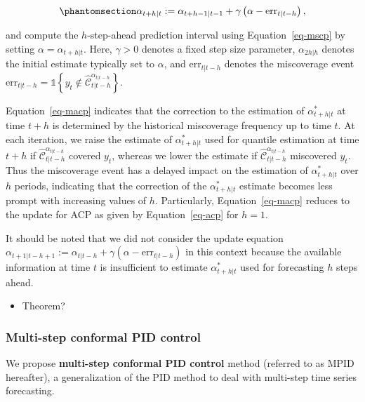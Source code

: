\documentclass[
  11pt,
  a4paper,
]{article}
\providecommand{\tightlist}{%
  \setlength{\itemsep}{0pt}\setlength{\parskip}{0pt}}\usepackage{longtable,booktabs,array}
\theoremstyle{plain}
\theoremstyle{plain}
\theoremstyle{remark}
\begin{document}
\begin{equation}\phantomsection\label{eq-macp}{
\alpha_{t+h|t} := \alpha_{t+h-1|t-1} + \gamma\left(\alpha - \mathrm{err}_{t|t-h}\right),
}\end{equation}

and compute the \(h\)-step-ahead prediction interval using
Equation~\ref{eq-mscp} by setting \(\alpha = \alpha_{t+h|t}\). Here,
\(\gamma > 0\) denotes a fixed step size parameter, \(\alpha_{2h|h}\)
denotes the initial estimate typically set to \(\alpha\), and
\(\mathrm{err}_{t|t-h}\) denotes the miscoverage event
\(\mathrm{err}_{t|t-h} = \mathbb{1}\left\{y_t \notin \hat{\mathcal{C}}_{t|t-h}^{\alpha_{t|t-h}}\right\}\).

Equation~\ref{eq-macp} indicates that the correction to the estimation
of \(\alpha_{t+h|t}^{*}\) at time \(t+h\) is determined by the
historical miscoverage frequency up to time \(t\). At each iteration, we
raise the estimate of \(\alpha_{t+h|t}^{*}\) used for quantile
estimation at time \(t+h\) if
\(\hat{\mathcal{C}}_{t|t-h}^{\alpha_{t|t-h}}\) covered \(y_t\), whereas
we lower the estimate if \(\hat{\mathcal{C}}_{t|t-h}^{\alpha_{t|t-h}}\)
miscovered \(y_t\). Thus the miscoverage event has a delayed impact on
the estimation of \(\alpha_{t+h|t}^{*}\) over \(h\) periods, indicating
that the correction of the \(\alpha_{t+h|t}^{*}\) estimate becomes less
prompt with increasing values of \(h\). Particularly,
Equation~\ref{eq-macp} reduces to the update for ACP as given by
Equation~\ref{eq-acp} for \(h=1\).

It should be noted that we did not consider the update equation
\(\alpha_{t+1|t-h+1} := \alpha_{t|t-h} + \gamma\left(\alpha - \mathrm{err}_{t|t-h}\right)\)
in this context because the available information at time \(t\) is
insufficient to estimate \(\alpha_{t+h|t}^{*}\) used for forecasting
\(h\) steps ahead.

\begin{itemize}
\tightlist
\item
  Theorem?
\end{itemize}

\subsubsection{Multi-step conformal PID
control}\label{multi-step-conformal-pid-control}

We propose \textbf{multi-step conformal PID control} method (referred to
as MPID hereafter), a generalization of the PID method to deal with
multi-step time series forecasting.
\end{document}

